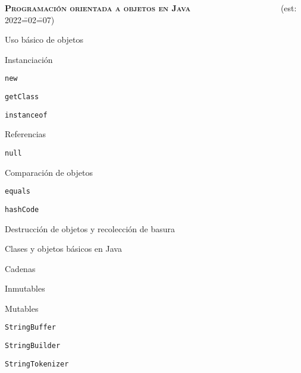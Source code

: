 \begin{longenum}
    \item \textbf{\textsc{Programación orientada a objetos en Java}} \ \ \ \ \ \ \ \ \ \ \ \ \ \ \ \ \ \ \ \ \ (est: 2022\==02\==07)
    \begin{longenum}
        \item Uso básico de objetos
        \begin{longenum}
            \item Instanciación
            \begin{longenum}
                \item \texttt{new}
                \item \texttt{getClass}
                \item \texttt{instanceof}
            \end{longenum}
            \item Referencias
            \begin{longenum}
                \item \texttt{null}
            \end{longenum}
            \item Comparación de objetos
            \begin{longenum}
                \item \texttt{equals}
                \item \texttt{hashCode}
            \end{longenum}
            \item Destrucción de objetos y recolección de basura
        \end{longenum}
        \item Clases y objetos básicos en Java
        \begin{longenum}
            \item Cadenas
            \begin{longenum}
                \item Inmutables
                \item Mutables
                \begin{longenum}
                    \item \texttt{StringBuffer}
                    \item \texttt{StringBuilder}
                    \item \texttt{StringTokenizer}
                \end{longenum}

\end{longenum}
\end{longenum}
\end{longenum}
\end{longenum}

